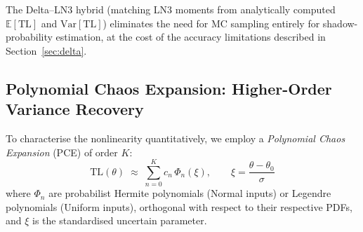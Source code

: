 \documentclass[11pt,a4paper]{article}
\newcommand{\EX}{\mathbb{E}}
\newcommand{\Var}{\mathrm{Var}}
\newcommand{\TL}{\mathrm{TL}}
\begin{document}
The Delta--LN3 hybrid (matching LN3 moments from analytically computed $\EX[\TL]$
and $\Var[\TL]$) eliminates the need for MC sampling entirely for shadow-probability
estimation, at the cost of the accuracy limitations described in Section~\ref{sec:delta}.

\subsection{Polynomial Chaos Expansion: Higher-Order Variance Recovery}
\label{sec:pce}

To characterise the nonlinearity quantitatively, we employ a
\emph{Polynomial Chaos Expansion} (PCE) of order $K$:
\begin{equation}
  \TL(\theta) \;\approx\; \sum_{n=0}^{K} c_n \,\Phi_n(\xi), \qquad
  \xi = \frac{\theta - \theta_0}{\sigma}
  \label{eq:pce}
\end{equation}
where $\Phi_n$ are probabilist Hermite polynomials (Normal inputs) or Legendre
polynomials (Uniform inputs), orthogonal with respect to their respective PDFs,
and $\xi$ is the standardised uncertain parameter.
\end{document}
